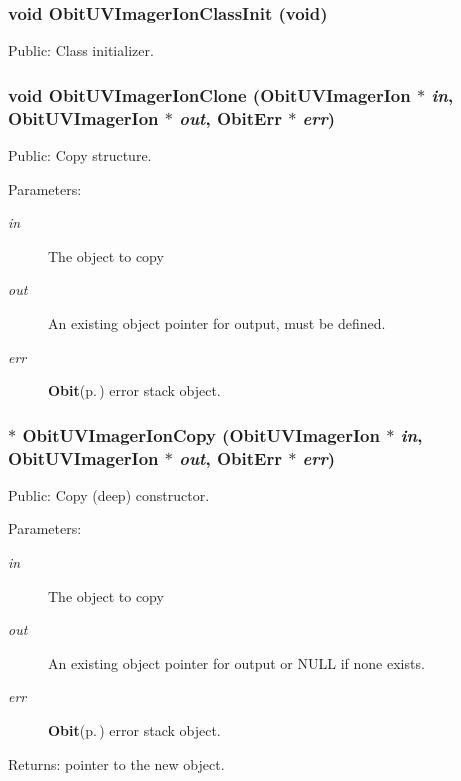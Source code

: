 \subsubsection{\setlength{\rightskip}{0pt plus 5cm}void Obit\-UVImager\-Ion\-Class\-Init (void)}\label{ObitUVImagerIon_8h_a3}


Public: Class initializer. 

\subsubsection{\setlength{\rightskip}{0pt plus 5cm}void Obit\-UVImager\-Ion\-Clone ({\bf Obit\-UVImager\-Ion} $\ast$ {\em in}, {\bf Obit\-UVImager\-Ion} $\ast$ {\em out}, {\bf Obit\-Err} $\ast$ {\em err})}\label{ObitUVImagerIon_8h_a8}


Public: Copy structure. 

\begin{Desc}
\item[Parameters:]
\begin{description}
\item[{\em in}]The object to copy \item[{\em out}]An existing object pointer for output, must be defined. \item[{\em err}]{\bf Obit}{\rm (p.\,\pageref{structObit})} error stack object. \end{description}
\end{Desc}
\subsubsection{$\ast$ Obit\-UVImager\-Ion\-Copy ({\bf Obit\-UVImager\-Ion} $\ast$ {\em in}, {\bf Obit\-UVImager\-Ion} $\ast$ {\em out}, {\bf Obit\-Err} $\ast$ {\em err})}\label{ObitUVImagerIon_8h_a7}


Public: Copy (deep) constructor. 

\begin{Desc}
\item[Parameters:]
\begin{description}
\item[{\em in}]The object to copy \item[{\em out}]An existing object pointer for output or NULL if none exists. \item[{\em err}]{\bf Obit}{\rm (p.\,\pageref{structObit})} error stack object. \end{description}
\end{Desc}
\begin{Desc}
\item[Returns:]pointer to the new object. \end{Desc}
